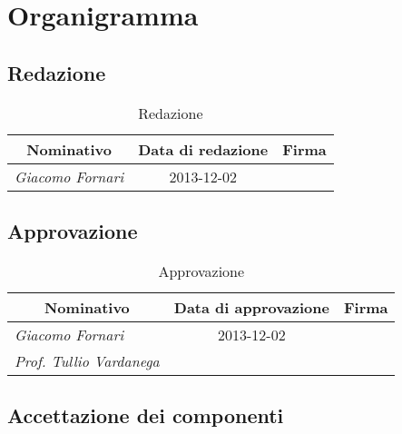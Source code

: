 \section{Organigramma}

	\subsection{Redazione}
	
	\def\arraystretch{2}
	\begin{table}[h]
	\centering
	\begin{tabular}{ l c l }
	\hline
	\multicolumn{1}{c}{\textbf{Nominativo}} & \multicolumn{1}{c}{\textbf{Data di redazione}} & \multicolumn{1}{c}{\textbf{Firma}} \\
	\hline
	\textit{Giacomo Fornari} & 2013-12-02 & \hspace{5cm} \\
	\hline
	\end{tabular}
	\caption{Redazione}
	\end{table}
		
	\subsection{Approvazione}
	
	\begin{table}[h]
	\centering
	\begin{tabular}{ l c l }
	\hline
	\multicolumn{1}{c}{\textbf{Nominativo}} & \multicolumn{1}{c}{\textbf{Data di approvazione}} & \multicolumn{1}{c}{\textbf{Firma}} \\
	\hline
	\textit{Giacomo Fornari} & 2013-12-02 & \hspace{5cm} \\
	\textit{Prof. Tullio Vardanega} &  & \hspace{5cm} \\
	\hline
	\end{tabular}
	\caption{Approvazione}
	\end{table}
	
	\subsection{Accettazione dei componenti}
	
